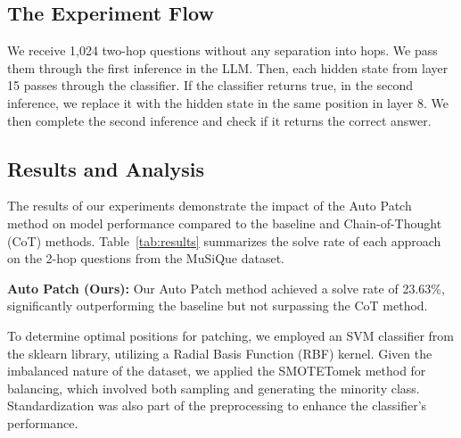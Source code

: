 \documentclass[11pt]{article}
\begin{document}
\subsection{The Experiment Flow}
We receive 1,024 two-hop questions without any separation into hops. We pass them through the first inference in the LLM. Then, each hidden state from layer 15 passes through the classifier. If the classifier returns true, in the second inference, we replace it with the hidden state in the same position in layer 8. We then complete the second inference and check if it returns the correct answer.


\subsection{Results and Analysis}

The results of our experiments demonstrate the impact of the Auto Patch method on model performance compared to the baseline and Chain-of-Thought (CoT) methods. Table~\ref{tab:results} summarizes the solve rate of each approach on the 2-hop questions from the MuSiQue dataset.

\begin{table}[h!]
    \centering
    \caption{Comparison of solve rate on MuSiQue 2-hop questions.}
    \label{tab:results}
\end{table}

\textbf{Auto Patch (Ours):} Our Auto Patch method achieved a solve rate of 23.63\%, significantly outperforming the baseline but not surpassing the CoT method.

To determine optimal positions for patching, we employed an SVM classifier from the sklearn library, utilizing a Radial Basis Function (RBF) kernel. Given the imbalanced nature of the dataset, we applied the SMOTETomek method for balancing, which involved both sampling and generating the minority class. Standardization was also part of the preprocessing to enhance the classifier's performance.
\end{document}
